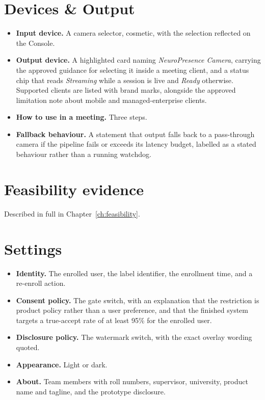 \documentclass[11pt,a4paper]{report}
\begin{document}
\section{Devices \& Output}

\begin{itemize}
  \item \textbf{Input device.} A camera selector, cosmetic, with the selection
    reflected on the Console.
  \item \textbf{Output device.} A highlighted card naming
    \emph{NeuroPresence Camera}, carrying the approved guidance for selecting
    it inside a meeting client, and a status chip that reads \emph{Streaming}
    while a session is live and \emph{Ready} otherwise. Supported clients are
    listed with brand marks, alongside the approved limitation note about
    mobile and managed-enterprise clients.
  \item \textbf{How to use in a meeting.} Three steps.
  \item \textbf{Fallback behaviour.} A statement that output falls back to a
    pass-through camera if the pipeline fails or exceeds its latency budget,
    labelled as a stated behaviour rather than a running watchdog.
\end{itemize}

\section{Feasibility evidence}

Described in full in Chapter~\ref{ch:feasibility}.

\section{Settings}

\begin{itemize}
  \item \textbf{Identity.} The enrolled user, the label identifier, the
    enrollment time, and a re-enroll action.
  \item \textbf{Consent policy.} The gate switch, with an explanation that the
    restriction is product policy rather than a user preference, and that the
    finished system targets a true-accept rate of at least 95\% for the
    enrolled user.
  \item \textbf{Disclosure policy.} The watermark switch, with the exact
    overlay wording quoted.
  \item \textbf{Appearance.} Light or dark.
  \item \textbf{About.} Team members with roll numbers, supervisor,
    university, product name and tagline, and the prototype disclosure.
\end{itemize}
\end{document}
